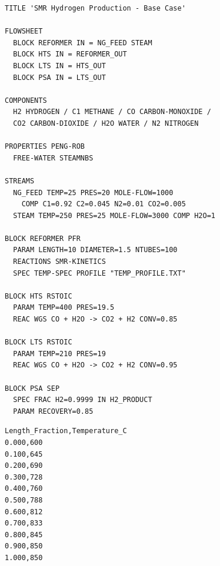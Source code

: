 \documentclass[12pt,twoside,openany]{book}
\begin{document}
\begin{lstlisting}[language={}, caption={SMR\_BaseCase.apw (complete)}]
TITLE 'SMR Hydrogen Production - Base Case'

FLOWSHEET
  BLOCK REFORMER IN = NG_FEED STEAM
  BLOCK HTS IN = REFORMER_OUT
  BLOCK LTS IN = HTS_OUT
  BLOCK PSA IN = LTS_OUT

COMPONENTS
  H2 HYDROGEN / C1 METHANE / CO CARBON-MONOXIDE /
  CO2 CARBON-DIOXIDE / H2O WATER / N2 NITROGEN

PROPERTIES PENG-ROB
  FREE-WATER STEAMNBS

STREAMS
  NG_FEED TEMP=25 PRES=20 MOLE-FLOW=1000
    COMP C1=0.92 C2=0.045 N2=0.01 CO2=0.005
  STEAM TEMP=250 PRES=25 MOLE-FLOW=3000 COMP H2O=1

BLOCK REFORMER PFR
  PARAM LENGTH=10 DIAMETER=1.5 NTUBES=100
  REACTIONS SMR-KINETICS
  SPEC TEMP-SPEC PROFILE "TEMP_PROFILE.TXT"

BLOCK HTS RSTOIC
  PARAM TEMP=400 PRES=19.5
  REAC WGS CO + H2O -> CO2 + H2 CONV=0.85

BLOCK LTS RSTOIC
  PARAM TEMP=210 PRES=19
  REAC WGS CO + H2O -> CO2 + H2 CONV=0.95

BLOCK PSA SEP
  SPEC FRAC H2=0.9999 IN H2_PRODUCT
  PARAM RECOVERY=0.85
\end{lstlisting}

\begin{lstlisting}[language={}, caption={TEMP\_PROFILE.txt}]
Length_Fraction,Temperature_C
0.000,600
0.100,645
0.200,690
0.300,728
0.400,760
0.500,788
0.600,812
0.700,833
0.800,845
0.900,850
1.000,850
\end{lstlisting}
\end{document}
